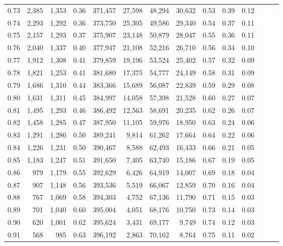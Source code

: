 \begin{tabular}{rrrrrrrrrrrrrr}
0.73 &  2,385 &  1,353 &  0.36 &  371,457 &   27,598 &  48,294 &  30,632 &  0.53 &  0.39 &      0.12 \\
0.74 &  2,293 &  1,292 &  0.36 &  373,750 &   25,305 &  49,586 &  29,340 &  0.54 &  0.37 &      0.11 \\
0.75 &  2,157 &  1,293 &  0.37 &  375,907 &   23,148 &  50,879 &  28,047 &  0.55 &  0.36 &      0.11 \\
0.76 &  2,040 &  1,337 &  0.40 &  377,947 &   21,108 &  52,216 &  26,710 &  0.56 &  0.34 &      0.10 \\
0.77 &  1,912 &  1,308 &  0.41 &  379,859 &   19,196 &  53,524 &  25,402 &  0.57 &  0.32 &      0.09 \\
0.78 &  1,821 &  1,253 &  0.41 &  381,680 &   17,375 &  54,777 &  24,149 &  0.58 &  0.31 &      0.09 \\
0.79 &  1,686 &  1,310 &  0.44 &  383,366 &   15,689 &  56,087 &  22,839 &  0.59 &  0.29 &      0.08 \\
0.80 &  1,631 &  1,311 &  0.45 &  384,997 &   14,058 &  57,398 &  21,528 &  0.60 &  0.27 &      0.07 \\
0.81 &  1,495 &  1,293 &  0.46 &  386,492 &   12,563 &  58,691 &  20,235 &  0.62 &  0.26 &      0.07 \\
0.82 &  1,458 &  1,285 &  0.47 &  387,950 &   11,105 &  59,976 &  18,950 &  0.63 &  0.24 &      0.06 \\
0.83 &  1,291 &  1,286 &  0.50 &  389,241 &    9,814 &  61,262 &  17,664 &  0.64 &  0.22 &      0.06 \\
0.84 &  1,226 &  1,231 &  0.50 &  390,467 &    8,588 &  62,493 &  16,433 &  0.66 &  0.21 &      0.05 \\
0.85 &  1,183 &  1,247 &  0.51 &  391,650 &    7,405 &  63,740 &  15,186 &  0.67 &  0.19 &      0.05 \\
0.86 &    979 &  1,179 &  0.55 &  392,629 &    6,426 &  64,919 &  14,007 &  0.69 &  0.18 &      0.04 \\
0.87 &    907 &  1,148 &  0.56 &  393,536 &    5,519 &  66,067 &  12,859 &  0.70 &  0.16 &      0.04 \\
0.88 &    767 &  1,069 &  0.58 &  394,303 &    4,752 &  67,136 &  11,790 &  0.71 &  0.15 &      0.03 \\
0.89 &    701 &  1,040 &  0.60 &  395,004 &    4,051 &  68,176 &  10,750 &  0.73 &  0.14 &      0.03 \\
0.90 &    620 &  1,001 &  0.62 &  395,624 &    3,431 &  69,177 &   9,749 &  0.74 &  0.12 &      0.03 \\
0.91 &    568 &    985 &  0.63 &  396,192 &    2,863 &  70,162 &   8,764 &  0.75 &  0.11 &      0.02 \\

\end{tabular}
